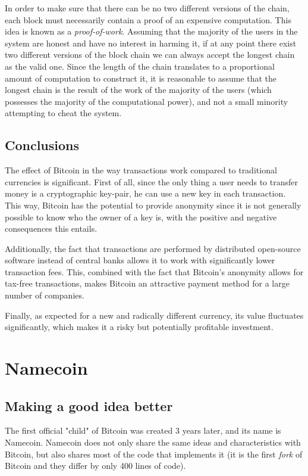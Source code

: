 \documentclass[journal]{IEEEtran}
\begin{document}
In order to make sure that there can be no two different versions of the chain, each block
must necessarily contain a proof of an expensive computation. This idea
is known as a \textit{proof-of-work}. 
Assuming that the majority of the users in the system are honest and have no interest in harming
it, if at any point there exist two different versions of the block chain we can always
accept the longest chain as the valid one. Since the length of the chain translates to a
proportional amount of computation to construct it, it is reasonable to assume that the
longest chain is the result of the work of the majority of the users (which possesses the
majority of the computational power), and not a small minority attempting to cheat the system.

\subsection{Conclusions}

The effect of Bitcoin in the way transactions work compared to traditional currencies is
significant. First of all, since the only thing a user needs to transfer money is a
cryptographic key-pair, he can use a new key in each transaction. This way, Bitcoin
has the potential to provide anonymity since it is not generally possible to know who
the owner of a key is, with the positive and negative consequences this entails.

Additionally, the fact that transactions are performed by distributed open-source
software instead of central banks allows it to work with significantly lower transaction fees.
This, combined with the fact that Bitcoin's anonymity allows for tax-free transactions,
makes Bitcoin an attractive payment method for a large number of companies.

Finally, as expected for a new and radically different currency, its value fluctuates
significantly, which makes it a risky but potentially profitable investment. 

\section{Namecoin}

\subsection{Making a good idea better}

The first official "child" of Bitcoin was created 3 years later, and its name is Namecoin. Namecoin
does not only share the same ideas and characteristics with Bitcoin, but also shares most of
the code that implements it (it is the first \textit{fork} of Bitcoin and they differ by 
only 400 lines of code).
\end{document}
